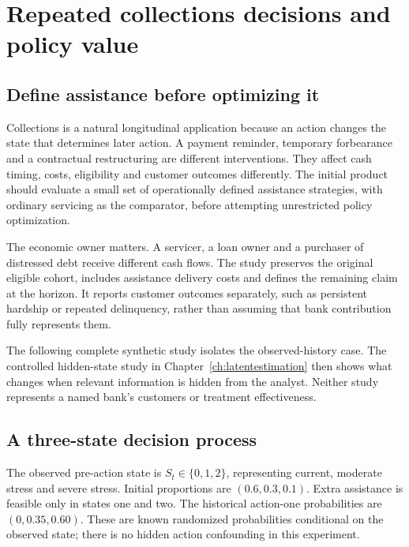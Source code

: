 \chapter{Repeated collections decisions and policy value}\label{ch:collections}
\section{Define assistance before optimizing it}
Collections is a natural longitudinal application because an action changes
the state that determines later action. A payment reminder, temporary
forbearance and a contractual restructuring are different interventions.
They affect cash timing, costs, eligibility and customer outcomes differently.
The initial product should evaluate a small set of operationally defined
assistance strategies, with ordinary servicing as the comparator, before
attempting unrestricted policy optimization.

The economic owner matters. A servicer, a loan owner and a purchaser of
distressed debt receive different cash flows. The study preserves the
original eligible cohort, includes assistance delivery costs and defines
the remaining claim at the horizon. It reports customer outcomes separately,
such as persistent hardship or repeated delinquency, rather than assuming
that bank contribution fully represents them.

The following complete synthetic study isolates the observed-history case.
The controlled hidden-state study in Chapter~\ref{ch:latentestimation}
then shows what changes when relevant information is hidden from the analyst.
Neither study represents a named bank's customers or treatment effectiveness.

\section{A three-state decision process}
The observed pre-action state is $S_t\in\{0,1,2\}$, representing
current, moderate stress and severe stress. Initial proportions are
$(0.6,0.3,0.1)$. Extra assistance is feasible only in states one and two.
The historical action-one probabilities are $(0,0.35,0.60)$.
These are known randomized probabilities conditional on the observed state;
there is no hidden action confounding in this experiment.

